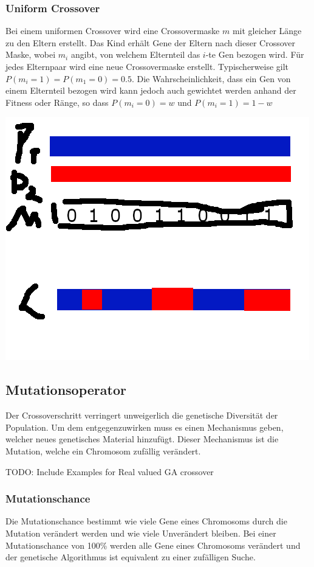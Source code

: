 \subsubsection*{Uniform Crossover}
Bei einem uniformen Crossover wird eine Crossovermaske $m$ mit gleicher Länge zu den Eltern erstellt. Das Kind erhält Gene der Eltern nach dieser Crossover Maske, wobei $m_i$ angibt, von welchem Elternteil das $i$-te Gen bezogen wird. Für jedes Elternpaar wird eine neue Crossovermaske erstellt. Typischerweise gilt $P(m_i = 1) = P(m_1 = 0) = 0.5$. Die Wahrscheinlichkeit, dass ein Gen von einem Elternteil bezogen wird kann jedoch auch gewichtet werden anhand der Fitness oder Ränge, so dass $P(m_i = 0) = w$ und $P(m_i = 1) = 1 - w$

\includegraphics[scale=1.0]{images/Uniform_Crossover.png}

\subsection{Mutationsoperator}
Der Crossoverschritt verringert unweigerlich die genetische Diversität der Population. Um dem entgegenzuwirken muss es einen Mechanismus geben, welcher neues genetisches Material hinzufügt. Dieser Mechanismus ist die Mutation, welche ein Chromosom zufällig verändert.

TODO: Include Examples for Real valued GA crossover 

\subsubsection*{Mutationschance}
Die Mutationschance bestimmt wie viele Gene eines Chromosoms durch die Mutation verändert werden und wie viele Unverändert bleiben. Bei einer Mutationschance von 100\% werden alle Gene eines Chromosoms verändert  und der genetische Algorithmus ist equivalent zu einer zufälligen Suche.~\cite*{TerminologiesAndOperators}


